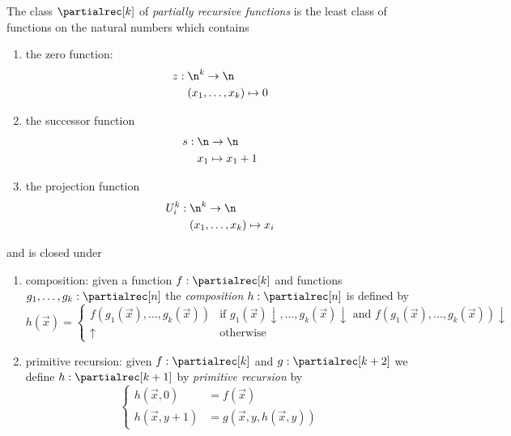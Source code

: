 \begin{definition}\label{def:partialrec}
  The class \(\partialrec[k]\) of \emph{partially recursive functions}
  is the least class of functions on the natural numbers which
  contains
  \begin{enumerate}[label=(\alph*)]
  \item\label{parec:a} the zero function:
    \begin{align*}
      z : \; & \n^k \to \n \\
      & (x_1, \dots, x_k) \mapsto 0
    \end{align*}
  \item\label{parec:b} the successor function
    \begin{align*}
      s : \; & \n \to \n \\
      & x_1 \mapsto x_1 + 1
    \end{align*}
  \item\label{parec:c} the projection function
    \begin{align*}
      U_i^k : \; & \n^k \to \n \\
      & (x_1,\dots,x_k) \mapsto x_i
    \end{align*}
  \end{enumerate}
  and is closed under
  \begin{enumerate}[label=(\arabic*)]
  \item\label{parec:1} composition: given a function
    \(f : \partialrec[k]\) and functions
    \(g_1, \dots, g_k : \partialrec[n]\) the \emph{composition}
    \(h : \partialrec[n]\) is defined by
    \begin{equation*}
      h(\vec{x}) =
      \begin{cases}
        f(g_1(\vec{x}), \dots, g_k(\vec{x})) & \text{if } g_1(\vec{x}) \downarrow, \dots, g_k(\vec{x}) \downarrow \text{ and } f(g_1(\vec{x}), \dots, g_k(\vec{x})) \downarrow \\
        \uparrow & \text{otherwise}
      \end{cases}
    \end{equation*}
  \item\label{parec:2} primitive recursion: given
    \(f : \partialrec[k]\) and \(g : \partialrec[k+2]\) we define
    \(h : \partialrec[k+1]\) by \emph{primitive recursion} by
    \begin{equation*}
      \begin{cases}
        h(\vec{x}, 0) & = f(\vec{x}) \\
        h(\vec{x}, y + 1) & = g(\vec{x}, y, h(\vec{x}, y))

\end{cases}
\end{equation*}
\end{enumerate}
\end{definition}

